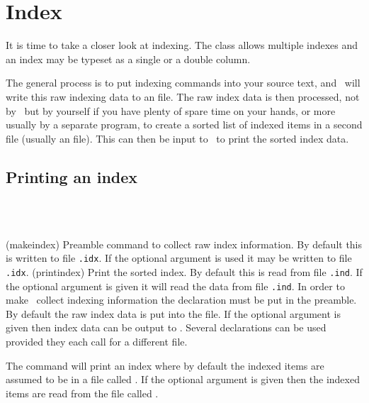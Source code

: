 
\section{Index} \label{sec:xref:index}


   It is time to take a closer look at indexing. The class allows 
multiple indexes and an index may be typeset as a 
single or a 
double column.

    The general process is to put indexing commands into your source text, 
and \ltx\ will write this raw indexing data to an  file. 
The raw index data is then processed, not by \ltx\ but by yourself if you 
have plenty of spare time on your hands, or more usually by a separate 
program, to create a sorted list of indexed items in a second file (usually
an  file). This can then be input to \ltx\ to print the sorted
index data.

\subsection{Printing an index}

\begin{syntax}
\cmd{\makeindex} \\
\cmd{\printindex} \\
\end{syntax}
\glossary(makeindex)%
  {}%
  {Preamble command to collect raw index information. By default this
   is written to file \texttt{.idx}. If the optional argument
   is used it may be written to file \texttt{.idx}.}
\glossary(printindex)%
  {}%
  {Print the sorted index. By default this is read from file 
   \texttt{.ind}. If the optional argument is given
   it will read the data from file \texttt{.ind}.}
In order to make \ltx\ collect indexing information the declaration 
\cmd{\makeindex} must be put in the preamble. By default
the raw index data is put into the  file. If
the optional  argument is given then index data can be
output to . Several \cmd{\makeindex} declarations
can be used provided they each call for a different file.

    The \cmd{\printindex} command will print an index 
where by default the indexed items are assumed to be in a file called 
. If the optional  argument 
is given
then the indexed items are read from the file called .

